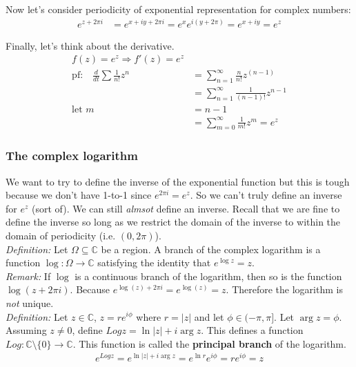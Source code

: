 \documentclass[a4paper, 11pt]{article}
\begin{document}
\noindent Now let's consider periodicity of exponential representation for complex numbers: 
	\begin{align*}
		e^{z+2\pi i} &= e^{x+iy+2\pi i} = e^{x}e^{i(y+2\pi)}= e^{x+iy} = e^{z}
	\end{align*}
	
\indent Finally, let's think about the derivative. 
	\begin{align*}
		f(z)=e^z \Rightarrow f'(z) = e^z \\ 
		\text{pf:} \quad \frac{d}{dt}\sum\frac{1}{n!}z^n &= \sum\limits_{n=1}^\infty \frac{n}{n!}z^(n-1) \\ 
			&= \sum\limits_{n=1}^\infty \frac{1}{(n-1)!}z^{n-1} \\ 
		\text{let } m &= n-1 \\ 
			&= \sum\limits_{m=0}^\infty \frac{1}{m!}z^m = e^z 
	\end{align*}
	
\subsubsection*{The complex logarithm} 
We want to try to define the inverse of the exponential function but this is tough because we don't have 1-to-1 since $e^{2\pi i} = e^z$. So we can't truly define an inverse for $e^z$ (sort of). We can still \textit{almsot} define an inverse. Recall that we are fine to define the inverse so long as we restrict the domain of the inverse to within the domain of periodicity (i.e. $(0, 2\pi)$).\\

\noindent\textit{Definition:} Let $\Omega \subseteq \mathbb{C}$ be a region. A branch of the complex logarithm is a function $\log:\Omega \rightarrow \mathbb{C}$ satisfying the identity that $e^{\log z} = z$. \\

\noindent\textit{Remark:} If $\log$ is a continuous branch of the logarithm, then so is the function $\log(z+2\pi i)$. Because $e^{\log(z)+2\pi i} = e^{\log(z)} = z$. Therefore the logarithm is \textit{not} unique. \\

\noindent \textit{Definition:} Let $z\in\mathbb{C}$, $z=re^{i\phi}$ where $r = |z|$ and let $\phi \in (-\pi, \pi]$. Let $\arg z = \phi$. Assuming $z\neq 0$, define $Log z = \ln |z| + i\arg z $. This defines a function $Log:\mathbb{C}\setminus\{0\}\rightarrow\mathbb{C}$. This function is called the \textbf{principal branch} of the logarithm. 
	\begin{align*}
		e^{Log z} = e^{\ln |z| + i\arg z} = e^{\ln r} e^{i\phi} = re^{i\phi} = z
	\end{align*}
\end{document}
